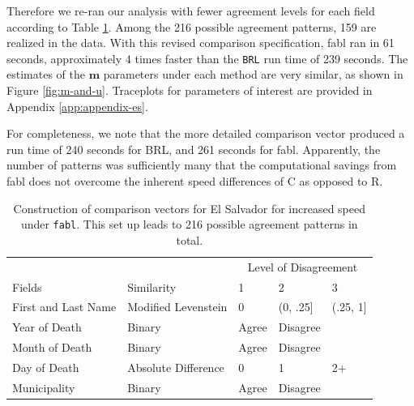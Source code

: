 \documentclass[ba]{imsart}
\begin{document}
	Therefore we re-ran our analysis with fewer agreement levels for each field according to Table \ref{Tab:el_salvador_cutoffs_2}. Among the 216 possible agreement patterns, 159 are realized in the data. With this revised comparison specification, fabl ran in 61 seconds, approximately 4 times faster than the \texttt{BRL} run time of 239 seconds.  The estimates of the $\bm{m}$ parameters under each method are very similar, as shown in Figure \ref{fig:m-and-u}. Traceplots for parameters of interest are provided in Appendix \ref{app:appendix-es}.
	
	For completeness, we note that the more detailed comparison vector produced a run time of 240 seconds for BRL, and 261 seconds for fabl.  Apparently, the number of patterns was sufficiently many that the computational savings from fabl does not overcome the inherent speed differences of C as opposed to R.
	
	\begin{table}
		\centering
		\begin{tabular}[t]{lllll}
			\multicolumn{2}{c}{ } & \multicolumn{3}{c}{Level of Disagreement} \\
			\cline{3-5}
			Fields & Similarity & 1 & 2 & 3\\
			\hline
			First and Last Name & Modified Levenstein & 0 & (0, .25] & (.25, 1]\\
			Year of Death & Binary & Agree & Disagree & \\
			Month of Death & Binary & Agree & Disagree & \\
			Day of Death & Absolute Difference & 0 & 1 & 2+\\
			Municipality & Binary & Agree & Disagree & \\
			\hline
		\end{tabular}
		\caption{Construction of comparison vectors for El Salvador for increased speed under \texttt{fabl}. This set up leads to 216 possible agreement patterns in total.}\label{Tab:el_salvador_cutoffs_2}
	\end{table}
	
\end{document}
